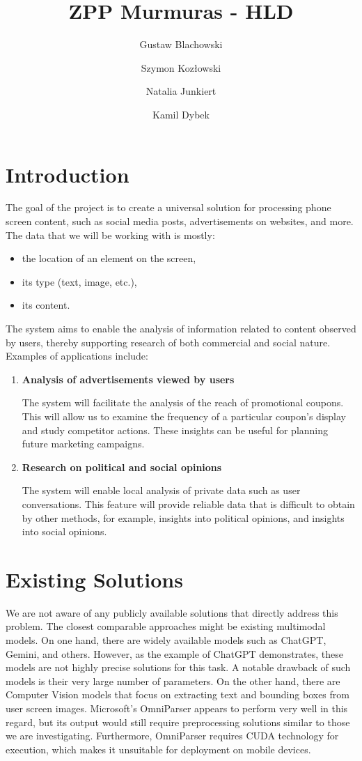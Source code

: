 \documentclass[12pt]{article}
\title{ZPP Murmuras - HLD}
\author{Gustaw Blachowski \and Szymon Kozłowski \and Natalia Junkiert \and Kamil Dybek}
\date{}
\begin{document}
\maketitle

\section*{Introduction}
The goal of the project is to create a universal solution for processing phone screen content, such as social media posts, advertisements on websites, and more. The data that we will be working with is mostly:
\begin{itemize}
    \item the location of an element on the screen,
    \item its type (text, image, etc.),
    \item its content.
\end{itemize}

The system aims to enable the analysis of information related to content observed by users, thereby supporting research of both commercial and social nature. Examples of applications include:
\begin{enumerate}
    \item \textbf{Analysis of advertisements viewed by users}

    The system will facilitate the analysis of the reach of promotional coupons. This will allow us to examine the frequency of a particular coupon’s display and study competitor actions.
These insights can be useful for planning future marketing campaigns.
    \item \textbf{Research on political and social opinions}

    The system will enable local analysis of private data such as user conversations. This feature will provide reliable data that is difficult to obtain by other methods, for example,
insights into political opinions, and insights into social opinions.
\end{enumerate}

\section*{Existing Solutions}
We are not aware of any publicly available solutions that directly address this problem. The closest comparable approaches might be existing multimodal models. On one hand, there are widely available models such as ChatGPT, Gemini, and others. However, as the example of ChatGPT demonstrates, these models are not highly precise solutions for this task. A notable drawback of such models is their very large number of parameters. On the other hand, there are Computer Vision models that focus on extracting text and bounding boxes from user screen images. Microsoft's OmniParser appears to perform very well in this regard, but its output would still require preprocessing solutions similar to those we are investigating. Furthermore, OmniParser requires CUDA technology for execution, which makes it unsuitable for deployment on mobile devices.
\end{document}
